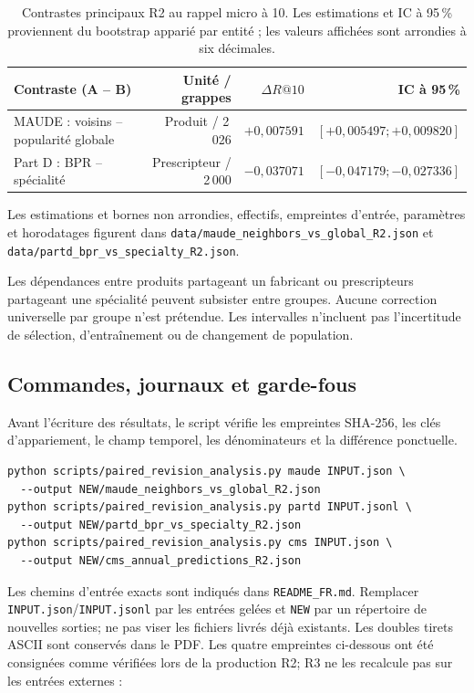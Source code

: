 \documentclass[10pt,a4paper]{article}
\newcommand{\src}[1]{{\small\nolinkurl{#1}}}
\begin{document}
\begin{table}[!htbp]\centering\small
\caption{Contrastes principaux R2 au rappel micro à 10. Les estimations et IC à 95\,\% proviennent du bootstrap apparié par entité ; les valeurs affichées sont arrondies à six décimales.}
\begin{tabularx}{\linewidth}{@{}Xrrr@{}}
\toprule
Contraste (A -- B) & Unité / grappes & $\Delta R@10$ & IC à 95\,\%\\
\midrule
MAUDE : voisins -- popularité globale & Produit / 2\,026 & $+0,007591$ & $[+0,005497;+0,009820]$\\
Part D : BPR -- spécialité & Prescripteur / 2\,000 & $-0,037071$ & $[-0,047179;-0,027336]$\\
\bottomrule
\end{tabularx}
\end{table}

Les estimations et bornes non arrondies, effectifs, empreintes d'entrée, paramètres et horodatages figurent dans \src{data/maude_neighbors_vs_global_R2.json} et \src{data/partd_bpr_vs_specialty_R2.json}.

Les dépendances entre produits partageant un fabricant ou prescripteurs partageant une spécialité peuvent subsister entre groupes. Aucune correction universelle par groupe n'est prétendue. Les intervalles n'incluent pas l'incertitude de sélection, d'entraînement ou de changement de population.

\subsection{Commandes, journaux et garde-fous}
Avant l'écriture des résultats, le script vérifie les empreintes SHA-256, les clés d'appariement, le champ temporel, les dénominateurs et la différence ponctuelle.

\begin{Verbatim}[fontsize=\footnotesize]
python scripts/paired_revision_analysis.py maude INPUT.json \
  --output NEW/maude_neighbors_vs_global_R2.json
python scripts/paired_revision_analysis.py partd INPUT.jsonl \
  --output NEW/partd_bpr_vs_specialty_R2.json
python scripts/paired_revision_analysis.py cms INPUT.json \
  --output NEW/cms_annual_predictions_R2.json
\end{Verbatim}

Les chemins d'entrée exacts sont indiqués dans \src{README_FR.md}. Remplacer \src{INPUT.json}/\src{INPUT.jsonl} par les entrées gelées et \src{NEW} par un répertoire de nouvelles sorties; ne pas viser les fichiers livrés déjà existants. Les doubles tirets ASCII sont conservés dans le PDF. Les quatre empreintes ci-dessous ont été consignées comme vérifiées lors de la production R2; R3 ne les recalcule pas sur les entrées externes :
\end{document}
